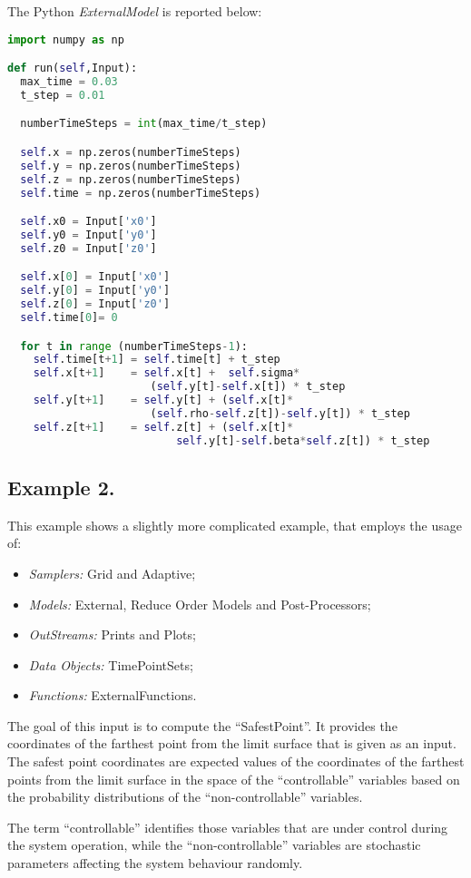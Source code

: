 The Python \textit{ExternalModel} is reported below:
\begin{lstlisting}[language=python]
import numpy as np

def run(self,Input):
  max_time = 0.03
  t_step = 0.01

  numberTimeSteps = int(max_time/t_step)

  self.x = np.zeros(numberTimeSteps)
  self.y = np.zeros(numberTimeSteps)
  self.z = np.zeros(numberTimeSteps)
  self.time = np.zeros(numberTimeSteps)

  self.x0 = Input['x0']
  self.y0 = Input['y0']
  self.z0 = Input['z0']

  self.x[0] = Input['x0']
  self.y[0] = Input['y0']
  self.z[0] = Input['z0']
  self.time[0]= 0

  for t in range (numberTimeSteps-1):
    self.time[t+1] = self.time[t] + t_step
    self.x[t+1]    = self.x[t] +  self.sigma*
                      (self.y[t]-self.x[t]) * t_step
    self.y[t+1]    = self.y[t] + (self.x[t]*
                      (self.rho-self.z[t])-self.y[t]) * t_step
    self.z[t+1]    = self.z[t] + (self.x[t]*
                          self.y[t]-self.beta*self.z[t]) * t_step
\end{lstlisting}
\subsection{Example 2.}
\label{subsec:ex1}
This example shows a slightly more complicated example, that employs the usage of:
\begin{itemize}
    \item \textit{Samplers:} Grid and Adaptive;
    \item \textit{Models:} External, Reduce Order Models and Post-Processors;
    \item \textit{OutStreams:} Prints and Plots;
    \item \textit{Data Objects:} TimePointSets;
    \item \textit{Functions:} ExternalFunctions.
\end{itemize}
The goal of this input is to compute the ``SafestPoint''.
It provides the coordinates of the farthest
point from the limit surface that is given as an input.
%
The safest point coordinates are expected values of the coordinates of the
farthest points from the limit surface in the space of the ``controllable''
variables based on the probability distributions of the ``non-controllable''
variables.

The term ``controllable'' identifies those variables that are under control
during the system operation, while the ``non-controllable'' variables are
stochastic parameters affecting the system behaviour randomly.

